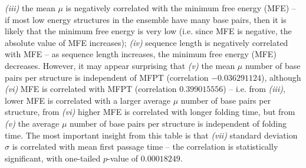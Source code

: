\begin{landscape}
\begin{table}[!h]
{{\em (iii)}
the mean $\mu$ is negatively correlated with the
minimum free energy (MFE) -- if most low energy structures in the ensemble
have many base pairs, then it is likely that the minimum free energy is very
low (i.e. since MFE is negative, the absolute value of MFE increases);
{\em (iv)}
sequence length is negatively correlated with MFE -- as sequence length
increases, the minimum free energy (MFE) decreases.
However, it may appear surprising that
{\em (v)} the
mean $\mu$ number of base pairs per structure is independent of MFPT
(correlation $-0.036291124$), although
{\em (vi)} MFE is correlated with MFPT
(correlation $0.399015556$) -- i.e.  from {\em (iii)},
lower MFE is correlated with a larger average $\mu$ number of base pairs per
structure, from {\em (vi)}
higher MFE is correlated with longer folding time, but
from {\em (v)} the average $\mu$  number of base pairs per structure is
independent of folding time.
The most important insight from this table is that
{\em (vii)}
standard deviation $\sigma$ is correlated with mean first passage
time -- the correlation is statistically significant, with one-tailed
$p$-value of $0.00018249$.}
\label{table:correlationFFTborEmpty}
\end{table}
\end{landscape}

